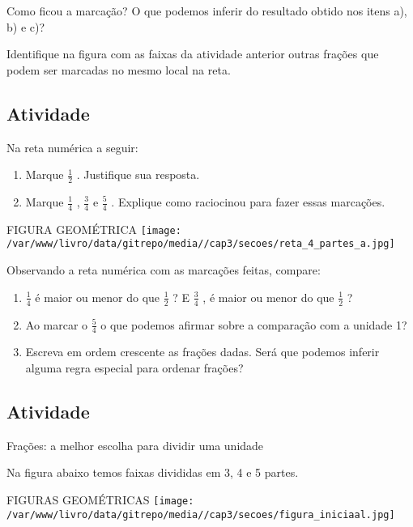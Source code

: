 \documentclass[a4,12pt]{book}
\begin{document}
Como ficou a marcação? O que podemos inferir do resultado obtido nos itens a), b) e c)?

Identifique na figura com as faixas da atividade anterior outras frações que podem ser marcadas no mesmo local na reta.


\subsection{Atividade}


Na reta numérica a seguir:
\begin{enumerate} [\quad a)] %
  \item     Marque     $\frac{1}{2}$    . Justifique sua resposta.
  \item     Marque     $\frac{1}{4}$    ,     $\frac{3}{4}$     e     $\frac{5}{4}$    . Explique como raciocinou para fazer essas marcações. 
\end{enumerate} %


\begin{imagem*}[breakable]{}{}   FIGURA GEOMÉTRICA  
    \texttt{[image: /var/www/livro/data/gitrepo/media//cap3/secoes/reta\_4\_partes\_a.jpg]}  
\end{imagem*}

Observando a reta numérica com as marcações feitas, compare: 
\begin{enumerate} [\quad a)] %
  \item         $\frac{1}{4}$     é maior ou menor do que     $\frac{1}{2}$    ? E     $\frac{3}{4}$    , é maior ou menor do que      $\frac{1}{2}$    ?
  \item     Ao marcar o     $\frac{5}{4}$     o que podemos afirmar sobre a comparação com a unidade 1?
  \item     Escreva em ordem crescente as frações dadas. Será que podemos inferir alguma regra especial para ordenar frações?
\end{enumerate} %


\subsection{Atividade}

Frações: a melhor escolha para dividir uma unidade

Na figura abaixo temos faixas divididas em 3, 4 e 5 partes. 

\begin{imagem*}[breakable]{}{}   FIGURAS GEOMÉTRICAS  
    \texttt{[image: /var/www/livro/data/gitrepo/media//cap3/secoes/figura\_iniciaal.jpg]}  
\end{imagem*}
\end{document}
